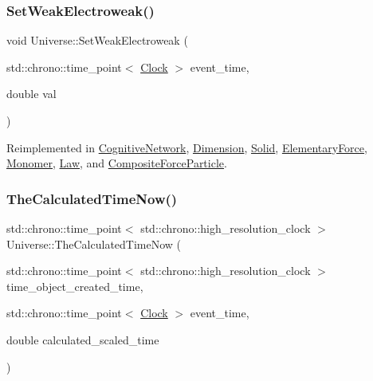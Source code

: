 \mbox{\label{classUniverse_a2d3d642bfdc863248e93535832fa4b00}} 
\subsubsection{\texorpdfstring{Set\+Weak\+Electroweak()}{SetWeakElectroweak()}}
{\footnotesize\ttfamily void Universe\+::\+Set\+Weak\+Electroweak (\begin{DoxyParamCaption}\item[{std\+::chrono\+::time\+\_\+point$<$ \mbox{\hyperlink{universe_8h_a0ef8d951d1ca5ab3cfaf7ab4c7a6fd80}{Clock}} $>$}]{event\+\_\+time,  }\item[{double}]{val }\end{DoxyParamCaption})\hspace{0.3cm}{\ttfamily [virtual]}}



Reimplemented in \mbox{\hyperlink{classCognitiveNetwork_a116f6818986a622e4a318857859e2495}{Cognitive\+Network}}, \mbox{\hyperlink{classDimension_a1d2accef9e6adf747f5cc143ae4527c9}{Dimension}}, \mbox{\hyperlink{classSolid_adb34befc66f8c681f3a85c44e0d00e3a}{Solid}}, \mbox{\hyperlink{classElementaryForce_a38d4f86f18a9f84a4198ee43bc90f6b4}{Elementary\+Force}}, \mbox{\hyperlink{classMonomer_ab887d7cfd2ecb557efb3ace59852019c}{Monomer}}, \mbox{\hyperlink{classLaw_a65e5e757041c1e72bb046eccbb6d66db}{Law}}, and \mbox{\hyperlink{classCompositeForceParticle_a73a3792ae1c334e74f945fea56083f0b}{Composite\+Force\+Particle}}.

\mbox{\label{classUniverse_aa220508c4cc12b02c6fe494622ebb58d}} 
\subsubsection{\texorpdfstring{The\+Calculated\+Time\+Now()}{TheCalculatedTimeNow()}}
{\footnotesize\ttfamily std\+::chrono\+::time\+\_\+point$<$ std\+::chrono\+::high\+\_\+resolution\+\_\+clock $>$ Universe\+::\+The\+Calculated\+Time\+Now (\begin{DoxyParamCaption}\item[{std\+::chrono\+::time\+\_\+point$<$ std\+::chrono\+::high\+\_\+resolution\+\_\+clock $>$}]{time\+\_\+object\+\_\+created\+\_\+time,  }\item[{std\+::chrono\+::time\+\_\+point$<$ \mbox{\hyperlink{universe_8h_a0ef8d951d1ca5ab3cfaf7ab4c7a6fd80}{Clock}} $>$}]{event\+\_\+time,  }\item[{double}]{calculated\+\_\+scaled\+\_\+time }\end{DoxyParamCaption})}

